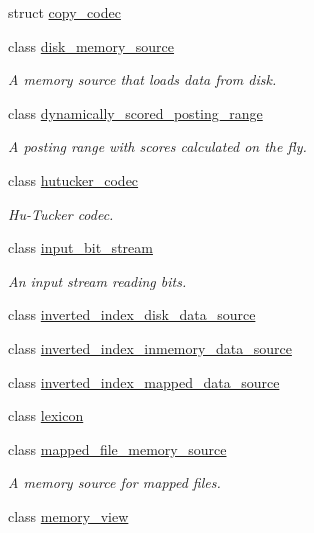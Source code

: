 \begin{DoxyCompactItemize}
\item 
struct \mbox{\hyperlink{structirk_1_1copy__codec}{copy\+\_\+codec}}
\item 
class \mbox{\hyperlink{classirk_1_1disk__memory__source}{disk\+\_\+memory\+\_\+source}}
\begin{DoxyCompactList}\small\item\em A memory source that loads data from disk. \end{DoxyCompactList}\item 
class \mbox{\hyperlink{classirk_1_1dynamically__scored__posting__range}{dynamically\+\_\+scored\+\_\+posting\+\_\+range}}
\begin{DoxyCompactList}\small\item\em A posting range with scores calculated on the fly. \end{DoxyCompactList}\item 
class \mbox{\hyperlink{classirk_1_1hutucker__codec}{hutucker\+\_\+codec}}
\begin{DoxyCompactList}\small\item\em Hu-\/\+Tucker codec. \end{DoxyCompactList}\item 
class \mbox{\hyperlink{classirk_1_1input__bit__stream}{input\+\_\+bit\+\_\+stream}}
\begin{DoxyCompactList}\small\item\em An input stream reading bits. \end{DoxyCompactList}\item 
class \mbox{\hyperlink{classirk_1_1inverted__index__disk__data__source}{inverted\+\_\+index\+\_\+disk\+\_\+data\+\_\+source}}
\item 
class \mbox{\hyperlink{classirk_1_1inverted__index__inmemory__data__source}{inverted\+\_\+index\+\_\+inmemory\+\_\+data\+\_\+source}}
\item 
class \mbox{\hyperlink{classirk_1_1inverted__index__mapped__data__source}{inverted\+\_\+index\+\_\+mapped\+\_\+data\+\_\+source}}
\item 
class \mbox{\hyperlink{classirk_1_1lexicon}{lexicon}}
\item 
class \mbox{\hyperlink{classirk_1_1mapped__file__memory__source}{mapped\+\_\+file\+\_\+memory\+\_\+source}}
\begin{DoxyCompactList}\small\item\em A memory source for mapped files. \end{DoxyCompactList}\item 
class \mbox{\hyperlink{classirk_1_1memory__view}{memory\+\_\+view}}

\end{DoxyCompactItemize}
